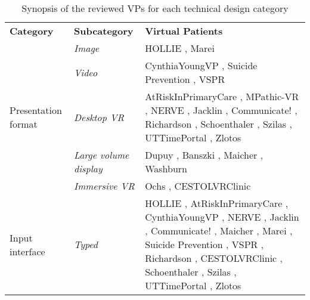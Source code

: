 
\begin{table} [t]
\scriptsize{
\begin{center}
    \caption{Synopsis of the reviewed VPs for each technical design category}
    \label{table:technicalDesignTable}
    \begin{tabular}{| p{1.8cm} | p{2cm} | p{8cm} |}
    \hline
        \rowcolor{mygray}
        \multicolumn{3}{|c|}{\textbf{Technical Design}}\\
    \hline
        \rowcolor{lightgray}
        \textbf{Category}  & \textbf{Subcategory} & \textbf{Virtual Patients}\\
    \hline
        \multirow{5}{1.8cm}{Presentation format} & \emph{Image} & HOLLIE \cite{adefila2020students},  Marei \cite{marei2018use}\\
    \cline{2-3}
        & \emph{Video} & CynthiaYoungVP \cite{foster2016using}, Suicide Prevention \cite{o2019suicide}, VSPR \cite{peddle2019exploring,peddle2019development}\\
    \cline{2-3}
        & \emph{Desktop VR} & AtRiskInPrimaryCare \cite{albright2018using}, MPathic-VR \cite{guetterman2019medical,kron2017using}, NERVE
        \cite{hirumi2016advancingPart2,hirumi2016advancing,kleinsmith2015understanding}, Jacklin \cite{jacklin2019virtual,jacklin2018improving}, 
        Communicate! \cite{jeuring2015communicate}, Richardson \cite{richardson2019virtual}, Schoenthaler \cite{schoenthaler2017simulated}, Szilas \cite{szilas2019virtual}, UTTimePortal \cite{zielke2016beyond,zielke2016using}, Zlotos \cite{zlotos2016scenario}\\
    \cline{2-3}
        & \emph{Large volume display} & Dupuy \cite{dupuy2019virtual}, Banszki \cite{banszki2018clinical,quail2016student}, Maicher \cite{maicher2017developing}, Washburn \cite{washburn2020virtual}\\
    \cline{2-3}
        & \emph{Immersive VR} & Ochs \cite{ochs2019training}, CESTOLVRClinic \cite{sapkaroski2018implementation}\\
    \hline
        \multirow{4}{1.8cm}{Input interface} & \emph{Typed} & HOLLIE \cite{adefila2020students}, AtRiskInPrimaryCare \cite{albright2018using}, CynthiaYoungVP \cite{foster2016using}, NERVE
        \cite{hirumi2016advancingPart2,hirumi2016advancing,kleinsmith2015understanding}, Jacklin \cite{jacklin2019virtual,jacklin2018improving}, Communicate! \cite{jeuring2015communicate}, Maicher \cite{maicher2017developing}, Marei \cite{marei2018use}, Suicide Prevention \cite{o2019suicide}, VSPR \cite{peddle2019exploring,peddle2019development}, Richardson \cite{richardson2019virtual}, CESTOLVRClinic \cite{sapkaroski2018implementation}, Schoenthaler \cite{schoenthaler2017simulated}, Szilas \cite{szilas2019virtual}, UTTimePortal \cite{zielke2016beyond,zielke2016using}, Zlotos \cite{zlotos2016scenario}\\

\end{tabular}
\end{center}}
\end{table}
